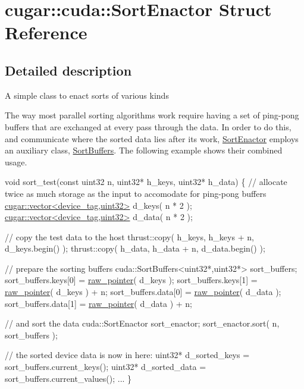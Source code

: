 \hypertarget{structcugar_1_1cuda_1_1_sort_enactor}{}\section{cugar\+:\+:cuda\+:\+:Sort\+Enactor Struct Reference}
\label{structcugar_1_1cuda_1_1_sort_enactor}


\subsection{Detailed description}
\begin{DoxyParagraph}{}
A simple class to enact sorts of various kinds 
\end{DoxyParagraph}
\begin{DoxyParagraph}{}
The way most parallel sorting algorithms work require having a set of ping-\/pong buffers that are exchanged at every pass through the data. In order to do this, and communicate where the sorted data lies after its work, \hyperlink{structcugar_1_1cuda_1_1_sort_enactor}{Sort\+Enactor} employs an auxiliary class, \hyperlink{structcugar_1_1cuda_1_1_sort_buffers}{Sort\+Buffers}. The following example shows their combined usage.
\end{DoxyParagraph}

\begin{DoxyCode}
\textcolor{keywordtype}{void} sort\_test(\textcolor{keyword}{const} uint32 n, uint32* h\_keys, uint32* h\_data)
\{
    \textcolor{comment}{// allocate twice as much storage as the input to accomodate for ping-pong buffers}
    \hyperlink{structcugar_1_1vector}{cugar::vector<device\_tag,uint32>} d\_keys( n * 2 );
    \hyperlink{structcugar_1_1vector}{cugar::vector<device\_tag,uint32>} d\_data( n * 2 );

    \textcolor{comment}{// copy the test data to the host}
    thrust::copy( h\_keys, h\_keys + n, d\_keys.begin() );
    thrust::copy( h\_data, h\_data + n, d\_data.begin() );

    \textcolor{comment}{// prepare the sorting buffers}
    cuda::SortBuffers<uint32*,uint32*> sort\_buffers;
    sort\_buffers.keys[0] = \hyperlink{namespacecugar_a3f6cb2c817f2ba065931cec569aa848b}{raw\_pointer}( d\_keys );
    sort\_buffers.keys[1] = \hyperlink{namespacecugar_a3f6cb2c817f2ba065931cec569aa848b}{raw\_pointer}( d\_keys ) + n;
    sort\_buffers.data[0] = \hyperlink{namespacecugar_a3f6cb2c817f2ba065931cec569aa848b}{raw\_pointer}( d\_data );
    sort\_buffers.data[1] = \hyperlink{namespacecugar_a3f6cb2c817f2ba065931cec569aa848b}{raw\_pointer}( d\_data ) + n;

    \textcolor{comment}{// and sort the data}
    cuda::SortEnactor sort\_enactor;
    sort\_enactor.sort( n, sort\_buffers );

    \textcolor{comment}{// the sorted device data is now in here:}
    uint32* d\_sorted\_keys = sort\_buffers.current\_keys();
    uint32* d\_sorted\_data = sort\_buffers.current\_values();
    ...
\}
\end{DoxyCode}
 

